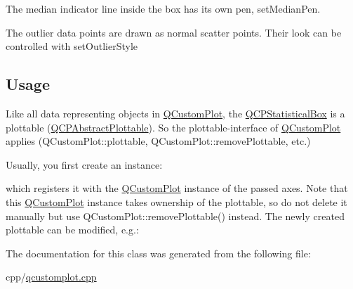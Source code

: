 The median indicator line inside the box has its own pen, set\+Median\+Pen.

The outlier data points are drawn as normal scatter points. Their look can be controlled with set\+Outlier\+Style\hypertarget{class_q_c_p_statistical_box_qcpstatisticalbox-usage}{}\subsection{Usage}\label{class_q_c_p_statistical_box_qcpstatisticalbox-usage}
Like all data representing objects in \mbox{\hyperlink{class_q_custom_plot}{Q\+Custom\+Plot}}, the \mbox{\hyperlink{class_q_c_p_statistical_box}{Q\+C\+P\+Statistical\+Box}} is a plottable (\mbox{\hyperlink{class_q_c_p_abstract_plottable}{Q\+C\+P\+Abstract\+Plottable}}). So the plottable-\/interface of \mbox{\hyperlink{class_q_custom_plot}{Q\+Custom\+Plot}} applies (Q\+Custom\+Plot\+::plottable, Q\+Custom\+Plot\+::remove\+Plottable, etc.)

Usually, you first create an instance\+: 
\begin{DoxyCodeInclude}
\end{DoxyCodeInclude}
which registers it with the \mbox{\hyperlink{class_q_custom_plot}{Q\+Custom\+Plot}} instance of the passed axes. Note that this \mbox{\hyperlink{class_q_custom_plot}{Q\+Custom\+Plot}} instance takes ownership of the plottable, so do not delete it manually but use Q\+Custom\+Plot\+::remove\+Plottable() instead. The newly created plottable can be modified, e.\+g.\+: 
\begin{DoxyCodeInclude}
\end{DoxyCodeInclude}


The documentation for this class was generated from the following file\+:\begin{DoxyCompactItemize}
\item 
cpp/\mbox{\hyperlink{qcustomplot_8cpp}{qcustomplot.\+cpp}}\end{DoxyCompactItemize}
